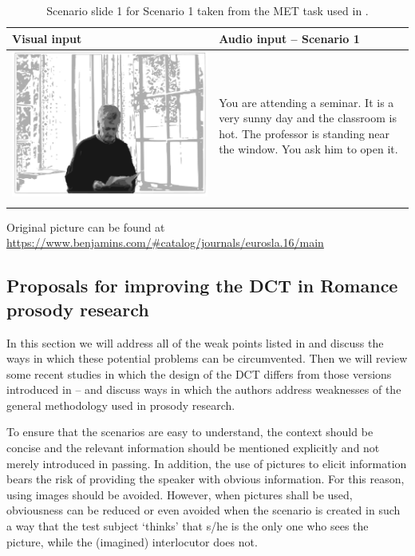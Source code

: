 \documentclass[output=paper]{LSP/langsci}
\begin{document}
\begin{table}
\begin{tabularx}{\textwidth}{p{}Q}
\lsptoprule
 Visual input &  Audio input – Scenario 1 \\
 \midrule
 \vspace*{0pt}
 \includegraphics[width=.6\textwidth]{figures/readerphoto1.pdf}
 	  & \vspace*{0pt} You are attending a seminar. It is a very sunny day and the classroom is hot. The professor is standing near the window. You ask him to open it.\\
\lspbottomrule
\end{tabularx}
\caption{\label{tab:van:2} Scenario slide 1 for Scenario 1 taken from the MET task used in \citet{Schauer2004}.} 
Original picture can be found at \url{https://www.benjamins.com/#catalog/journals/eurosla.16/main}
\end{table}

\subsection{Proposals for improving the DCT in Romance prosody research}
\label{sec:van:3.2}
In this section we will address all of the weak points listed in  and discuss the ways in which these potential problems can be circumvented. Then we will review some recent studies in which the design of the DCT differs from those versions introduced in -- and discuss ways in which the authors address weaknesses of the general methodology used in prosody research.

To ensure that the scenarios are easy to understand, the context should be concise and the relevant information should be mentioned explicitly and not merely introduced in passing. In addition, the use of pictures to elicit information bears the risk of providing the speaker with obvious information. For this reason, using images should be avoided. However, when pictures shall be used, obviousness can be reduced or even avoided when the scenario is created in such a way that the test subject ‘thinks’ that s/he is the only one who sees the picture, while the (imagined) interlocutor does not.
\end{document}
